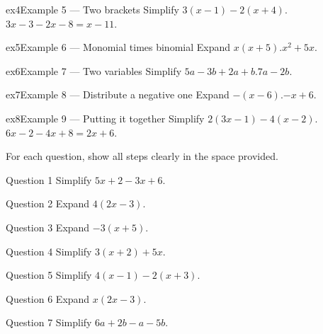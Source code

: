 \documentclass[11pt]{article}
\begin{document}
\begin{example}{ex4}{Example 5 --- Two brackets}
Simplify $3(x-1)-2(x+4)$.\soln $3x-3-2x-8=x-11$.
\end{example}

\begin{example}{ex5}{Example 6 --- Monomial times binomial}
Expand $x(x+5)$.\soln $x^2+5x$.
\end{example}

\begin{example}{ex6}{Example 7 --- Two variables}
Simplify $5a-3b+2a+b$.\soln $7a-2b$.
\end{example}

\begin{example}{ex7}{Example 8 --- Distribute a negative one}
Expand $-(x-6)$.\soln $-x+6$.
\end{example}

\begin{example}{ex8}{Example 9 --- Putting it together}
Simplify $2(3x-1)-4(x-2)$.\soln $6x-2-4x+8=2x+6$.
\end{example}

\clearpage
{}
For each question, show all steps clearly in the space provided.

\begin{qbox}{Question 1}
Simplify $5x+2-3x+6$.\workspace{1.8cm}
\end{qbox}

\begin{qbox}{Question 2}
Expand $4(2x-3)$.\workspace{1.8cm}
\end{qbox}

\begin{qbox}{Question 3}
Expand $-3(x+5)$.\workspace{1.8cm}
\end{qbox}

\begin{qbox}{Question 4}
Simplify $3(x+2)+5x$.\workspace{2.0cm}
\end{qbox}

\begin{qbox}{Question 5}
Simplify $4(x-1)-2(x+3)$.\workspace{2.2cm}
\end{qbox}

\begin{qbox}{Question 6}
Expand $x(2x-3)$.\workspace{1.8cm}
\end{qbox}

\begin{qbox}{Question 7}
Simplify $6a+2b-a-5b$.\workspace{2.0cm}
\end{qbox}
\end{document}
